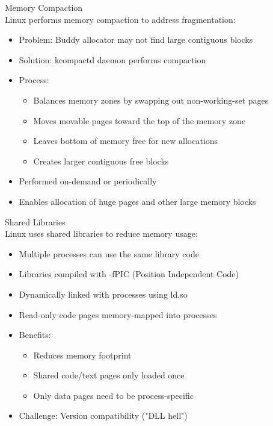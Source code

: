 \begin{definition}{Memory Compaction}\\
    Linux performs memory compaction to address fragmentation:
    \begin{itemize}
        \item Problem: Buddy allocator may not find large contiguous blocks
        \item Solution: kcompactd daemon performs compaction
        \item Process:
            \begin{itemize}
                \item Balances memory zones by swapping out non-working-set pages
                \item Moves movable pages toward the top of the memory zone
                \item Leaves bottom of memory free for new allocations
                \item Creates larger contiguous free blocks
            \end{itemize}
        \item Performed on-demand or periodically
        \item Enables allocation of huge pages and other large memory blocks
    \end{itemize}
\end{definition}

\begin{definition}{Shared Libraries}\\
    Linux uses shared libraries to reduce memory usage:
    \begin{itemize}
        \item Multiple processes can use the same library code
        \item Libraries compiled with -fPIC (Position Independent Code)
        \item Dynamically linked with processes using ld.so
        \item Read-only code pages memory-mapped into processes
        \item Benefits:
            \begin{itemize}
                \item Reduces memory footprint
                \item Shared code/text pages only loaded once
                \item Only data pages need to be process-specific
            \end{itemize}
        \item Challenge: Version compatibility ("DLL hell")
    \end{itemize}
\end{definition}

